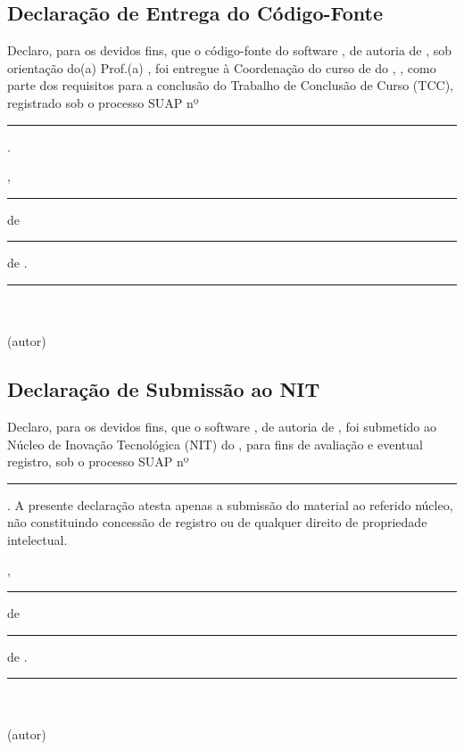 
\subsection{Declaração de Entrega do Código-Fonte}

Declaro, para os devidos fins, que o código-fonte do software
\Titulo, de autoria de \Autor, sob orientação do(a)
Prof.(a) \Orientador, foi entregue à Coordenação do curso de
\Curso{} do \Instituicao{}, \Campus, como parte dos requisitos para a
conclusão do Trabalho de Conclusão de Curso (TCC), registrado sob o
processo SUAP nº \rule[-0.2ex]{4cm}{0.4pt}.

\vspace{1.2cm}
\noindent\Cidade, \rule[-0.2ex]{1.2cm}{0.4pt} de \rule[-0.2ex]{3cm}{0.4pt} de \Ano.

\vspace{1.5cm}
\noindent\hfill\rule{8cm}{0.4pt}\hfill\mbox{}\\[-0.2ex]
\hspace*{\fill}\Autor\hspace*{\fill}\mbox{}\\[-0.2ex]
\hspace*{\fill}\small (autor)\hspace*{\fill}\mbox{}

\newpage

\subsection{Declaração de Submissão ao NIT}

Declaro, para os devidos fins, que o software \Titulo, de autoria
de \Autor, foi submetido ao Núcleo de Inovação Tecnológica (NIT)
do \Instituicao{}, para fins de avaliação e eventual registro, sob o
processo SUAP nº \rule[-0.2ex]{4cm}{0.4pt}. A presente declaração atesta
apenas a submissão do material ao referido núcleo, não constituindo
concessão de registro ou de qualquer direito de propriedade intelectual.

\vspace{1.2cm}
\noindent\Cidade, \rule[-0.2ex]{1.2cm}{0.4pt} de \rule[-0.2ex]{3cm}{0.4pt} de \Ano.

\vspace{1.5cm}
\noindent\hfill\rule{8cm}{0.4pt}\hfill\mbox{}\\[-0.2ex]
\hspace*{\fill}\Autor\hspace*{\fill}\mbox{}\\[-0.2ex]
\hspace*{\fill}\small (autor)\hspace*{\fill}\mbox{}
